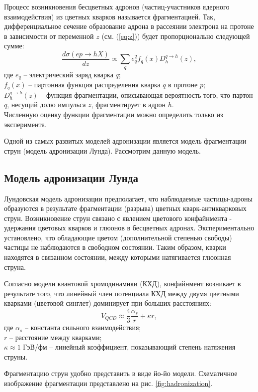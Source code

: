\documentclass{extreport}
\begin{document}
Процесс возникновения бесцветных адронов (частиц-участников ядерного взаимодействия) из цветных кварков называется фрагментацией. Так, дифференциальное сечение образование адрона в рассеянии электрона на протоне в зависимости от переменной $z$ (см. (\ref{eq:z})) будет пропорционально следующей сумме:
\begin{equation}
	\frac{d\sigma(ep \rightarrow hX)}{dz} \propto \sum_q e_q^2 f_q (x) D_h^{q \rightarrow h}(z),
\end{equation}
где $e_q$ -- электрический заряд кварка $q$; \\ $f_q (x)$ -- партонная функция распределения кварка $q$ в протоне $p$; \\ $D_h^{q \rightarrow h}(z)$ -- функция фрагментации, описывающая вероятность того, что партон $q$, несущий долю импульса $z$, фрагментирует в адрон $h$. \\ Численную оценку функции фрагментации можно определить только из эксперимента.

Одной из самых развитых моделей адронизации является модель фрагментации струн (модель адронизации Лунда). Рассмотрим данную модель.
\subsection{Модель адронизации Лунда}
Лундовская модель адронизации предполагает, что наблюдаемые частицы-адроны образуются в результате фрагментации (разрыва) цветных кварк-антикварковых струн. Возникновение струн связано с явлением цветового конфайнмента - удержания цветовых кварков и глюонов в бесцветных адронах. Экспериментально установлено, что обладающие цветом (дополнительной степенью свободы) частицы не наблюдаются в свободном состоянии.  Таким образом, кварки находятся в связанном состоянии, между которыми натягивается глюонная струна. 

Согласно модели квантовой хромодинамики (КХД), конфайнмент возникает в результате того, что линейный член потенциала КХД между двумя цветными кварками (цветовой синглет) доминирует при больших расстояниях:
\begin{equation}
	V_{QCD}\approx \frac{4}{3} \frac{\alpha_s}{r} + \kappa r,
\end{equation}
где $\alpha_s$ -- константа сильного взаимодействия; \\ $r$ -- расстояние между кварками; \\ $\kappa \approx 1$ ГэВ/фм -- линейный коэффициент, показывающий степень натяжения струны. 


Фрагментацию струн удобно представить в виде йо-йо модели. Схематичное изображение фрагментации представлено на рис. \ref{fig:hadronization}.
\end{document}
